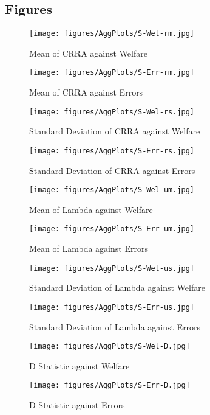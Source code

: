 \documentclass[../main.tex]{subfiles}
\begin{document}
\newpage

\subsection{Figures}

\begin{figure}[hp!]
	\center
	\caption{Mean of CRRA against Welfare}
	\texttt{[image: figures/AggPlots/S-Wel-rm.jpg]}
	\label{fig:S-Wel-rm}
\end{figure}

\begin{figure}[hp!]
	\center
	\caption{Mean of CRRA against Errors}
	\texttt{[image: figures/AggPlots/S-Err-rm.jpg]}
	\label{fig:S-Err-rm}
\end{figure}

\begin{figure}[hp!]
	\center
	\caption{Standard Deviation of CRRA against Welfare}
	\texttt{[image: figures/AggPlots/S-Wel-rs.jpg]}
	\label{fig:S-Wel-rs}
\end{figure}

\begin{figure}[hp!]
	\center
	\caption{Standard Deviation of CRRA against Errors}
	\texttt{[image: figures/AggPlots/S-Err-rs.jpg]}
	\label{fig:S-Err-rs}
\end{figure}

\begin{figure}[hp!]
	\center
	\caption{Mean of Lambda against Welfare}
	\texttt{[image: figures/AggPlots/S-Wel-um.jpg]}
	\label{fig:S-Wel-um}
\end{figure}

\begin{figure}[hp!]
	\center
	\caption{Mean of Lambda against Errors}
	\texttt{[image: figures/AggPlots/S-Err-um.jpg]}
	\label{fig:S-Err-um}
\end{figure}

\begin{figure}[hp!]
	\center
	\caption{Standard Deviation of Lambda against Welfare}
	\texttt{[image: figures/AggPlots/S-Wel-us.jpg]}
	\label{fig:S-Wel-us}
\end{figure}

\begin{figure}[hp!]
	\center
	\caption{Standard Deviation of Lambda against Errors}
	\texttt{[image: figures/AggPlots/S-Err-us.jpg]}
	\label{fig:S-Err-us}
\end{figure}

\begin{figure}[hp!]
	\center
	\caption{D Statistic against Welfare}
	\texttt{[image: figures/AggPlots/S-Wel-D.jpg]}
	\label{fig:D-Wel-smooth}
\end{figure}

\begin{figure}[hp!]
	\center
	\caption{D Statistic against Errors}
	\texttt{[image: figures/AggPlots/S-Err-D.jpg]}
	\label{fig:D-Err-smooth}
\end{figure}

\newpage

\printbibliography
\end{document}
